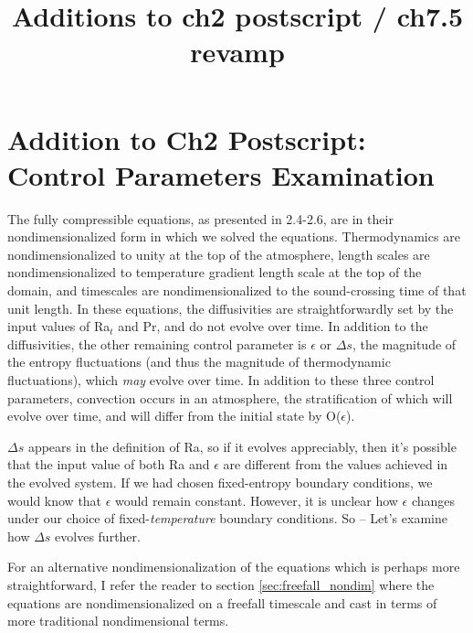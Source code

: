\documentclass[aps, pre, onecolumn, nofootinbib, notitlepage, groupedaddress, amsfonts, amssymb, amsmath, longbibliography, superscriptaddress]{revtex4-1}
\begin{document}

\title{Additions to ch2 postscript / ch7.5 revamp}

\maketitle


\section{Addition to Ch2 Postscript: Control Parameters Examination}
The fully compressible equations, as presented in 2.4-2.6, are in their nondimensionalized form in which we solved the equations.
Thermodynamics are nondimensionalized to unity at the top of the atmosphere, length scales are nondimensionalized to temperature gradient length scale at the top of the domain, and timescales are nondimensionalized to the sound-crossing time of that unit length.
In these equations, the diffusivities are straightforwardly set by the input values of Ra$_t$ and Pr, and do not evolve over time.
In addition to the diffusivities, the other remaining control parameter is $\epsilon$ or $\Delta s$, the magnitude of the entropy fluctuations (and thus the magnitude of thermodynamic fluctuations), which \emph{may} evolve over time.
In addition to these three control parameters, convection occurs in an atmosphere, the stratification of which will evolve over time, and will differ from the initial state by O($\epsilon$).

$\Delta s$ appears in the definition of Ra, so if it evolves appreciably, then it's possible that the input value of both Ra and $\epsilon$ are different from the values achieved in the evolved system.
If we had chosen fixed-entropy boundary conditions, we would know that $\epsilon$ would remain constant.
However, it is unclear how $\epsilon$ changes under our choice of fixed-\emph{temperature} boundary conditions.
So -- Let's examine how $\Delta s$ evolves further.

For an alternative nondimensionalization of the equations which is perhaps more straightforward, I refer the reader to section \ref{sec:freefall_nondim} where the equations are nondimensionalized on a freefall timescale and cast in terms of more traditional nondimensional terms.
\end{document}
